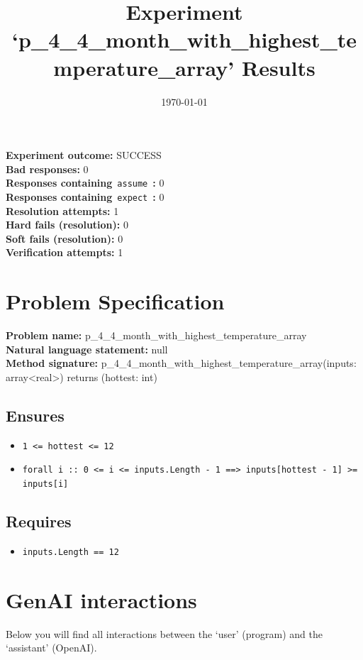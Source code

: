 \documentclass{article}
\begin{document}
\title{Experiment `p\_4\_4\_month\_with\_highest\_temperature\_array' Results}
\author{\today}
\date{}
\maketitle
\textbf{Experiment outcome: }SUCCESS
\\\textbf{Bad responses: }0
\\\textbf{Responses containing}~\texttt{assume}~\textbf{: }0
\\\textbf{Responses containing}~\texttt{expect}~\textbf{: }0
\\\textbf{Resolution attempts: }1
\\\textbf{Hard fails (resolution): }0
\\\textbf{Soft fails (resolution): }0
\\\textbf{Verification attempts: }1
\section*{Problem Specification}
\textbf{Problem name: }p\_4\_4\_month\_with\_highest\_temperature\_array
\\\textbf{Natural language statement: }null
\\\textbf{Method signature: }p\_4\_4\_month\_with\_highest\_temperature\_array(inputs: array<real>) returns (hottest: int)
\subsection*{Ensures}
\begin{itemize}
\item \texttt{1 <= hottest <= 12}
\item \texttt{forall i :: 0 <= i <= inputs.Length - 1 ==> inputs[hottest - 1] >= inputs[i]}
\end{itemize}
\subsection*{Requires}
\begin{itemize}
\item \texttt{inputs.Length == 12}
\end{itemize}
\clearpage
\section*{GenAI interactions}
Below you will find all interactions between the `user' (program) and the `assistant' (OpenAI).
\end{document}
